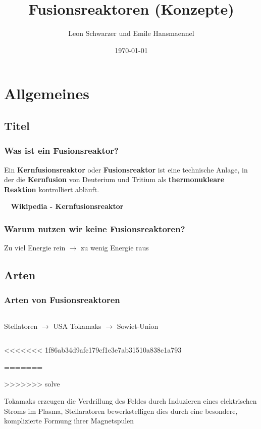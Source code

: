 \documentclass[aspectratio=169]{beamer}
\title{Fusionsreaktoren (Konzepte)}
\subtitle{}
\author{Leon Schwarzer und Emile Hansmaennel}
\institute{Theodor-Fliedner-Gymnasium}
\date{\today}
\begin{document}
  \begin{frame}
    \titlepage
  \end{frame}

  \section{Allgemeines}
    \subsection{Titel}

      \begin{frame}
        \frametitle{Was ist ein Fusionsreaktor?}
        Ein \textbf{Kernfusionsreaktor} oder \textbf{Fusionsreaktor} ist eine
        technische Anlage, in der die \textbf{Kernfusion} von Deuterium und Tritium als
        \textbf{thermonukleare Reaktion} kontrolliert abläuft.
        \par
        \raggedleft
        \textbf{~ Wikipedia - Kernfusionsreaktor}
      \end{frame}

      \begin{frame}
        \frametitle{Warum nutzen wir keine Fusionsreaktoren?}
        \center
        Zu viel Energie rein \( \rightarrow \) zu wenig Energie raus
      \end{frame}

    \subsection{Arten}

      \begin{frame}
        \frametitle{Arten von Fusionsreaktoren}
        \begin{columns}
          \center
          Stellatoren \( \rightarrow \) USA
          \bigskip
          \center
          Tokamaks \( \rightarrow \) Sowiet-Union
        \end{columns}

        \bigskip
        \bigskip
        \bigskip
<<<<<<< 1f86ab34d9afc179cf1e3e7ab31510a838c1a793
        
=======

>>>>>>> solve

        Tokamaks erzeugen die Verdrillung des Feldes durch Induzieren eines
        elektrischen Stroms im Plasma, Stellaratoren bewerkstelligen dies durch
        eine besondere, komplizierte Formung ihrer Magnetspulen

      \end{frame}
\end{document}

